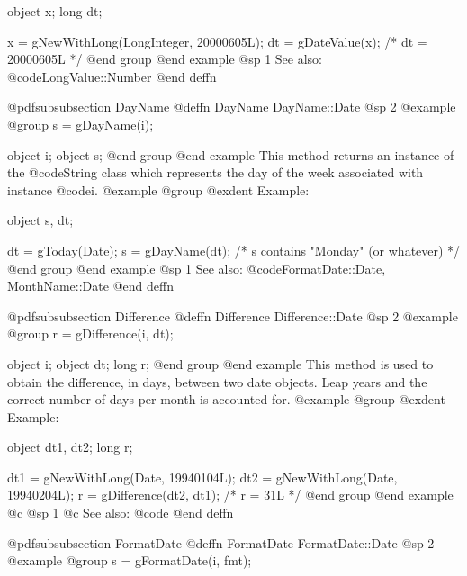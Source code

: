 object  x;
long    dt;

x = gNewWithLong(LongInteger, 20000605L);
dt = gDateValue(x);    /*  dt = 20000605L  */
@end group
@end example
@sp 1
See also:  @code{LongValue::Number}
@end deffn











@pdfsubsubsection {DayName}
@deffn {DayName} DayName::Date
@sp 2
@example
@group
s = gDayName(i);

object  i;
object  s;
@end group
@end example
This method returns an instance of the @code{String} class which represents
the day of the week associated with instance @code{i}.
@example
@group
@exdent Example:

object  s, dt;

dt = gToday(Date);
s = gDayName(dt);   /*  s contains "Monday" (or whatever)  */
@end group
@end example
@sp 1
See also:  @code{FormatDate::Date, MonthName::Date}
@end deffn










@pdfsubsubsection {Difference}
@deffn {Difference} Difference::Date
@sp 2
@example
@group
r = gDifference(i, dt);

object  i;
object  dt;
long    r;
@end group
@end example
This method is used to obtain the difference, in days, between two
date objects.  Leap years and the correct number of days per month
is accounted for.
@example
@group
@exdent Example:

object  dt1, dt2;
long    r;

dt1 = gNewWithLong(Date, 19940104L);
dt2 = gNewWithLong(Date, 19940204L);
r = gDifference(dt2, dt1);    /*  r = 31L  */
@end group
@end example
@c @sp 1
@c See also:  @code{}
@end deffn







@pdfsubsubsection {FormatDate}
@deffn {FormatDate} FormatDate::Date
@sp 2
@example
@group
s = gFormatDate(i, fmt);

